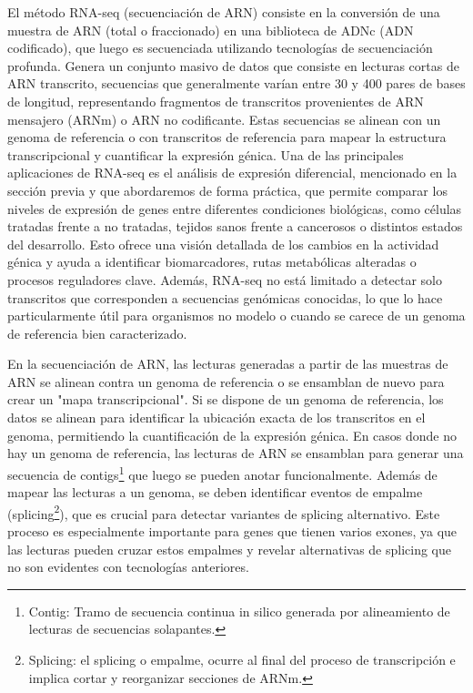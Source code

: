 El método RNA-seq (secuenciación de ARN) consiste en la conversión de una muestra de ARN (total o fraccionado) en una biblioteca de ADNc 
(ADN codificado), que luego es secuenciada utilizando tecnologías de secuenciación profunda. Genera un conjunto masivo de datos que consiste 
en lecturas cortas de ARN transcrito, secuencias que generalmente varían entre 30 y 400 pares de bases de longitud, representando fragmentos 
de transcritos provenientes de ARN mensajero (ARNm) o ARN no codificante. Estas secuencias se alinean con un genoma de referencia o con 
transcritos de referencia para mapear la estructura transcripcional y cuantificar la expresión génica. Una de las principales aplicaciones 
de RNA-seq es el análisis de expresión diferencial, mencionado en la sección previa y que abordaremos de forma práctica, que permite comparar 
los niveles de expresión de genes entre diferentes condiciones 
biológicas, como células tratadas frente a no tratadas, tejidos sanos frente a cancerosos o distintos estados del desarrollo. Esto ofrece 
una visión detallada de los cambios en la actividad génica y ayuda a identificar biomarcadores, rutas metabólicas alteradas o procesos 
reguladores clave. Además, RNA-seq no está limitado a detectar solo transcritos que corresponden a secuencias genómicas conocidas, 
lo que lo hace particularmente útil para organismos no modelo o cuando se carece de un genoma de referencia bien caracterizado\cite{transcriptomics-2-RNA-seq}.\newline

En la secuenciación de ARN, las lecturas generadas a partir de las muestras de ARN se alinean contra un genoma de referencia o se ensamblan de
nuevo para crear un "mapa transcripcional". Si se dispone de un genoma de referencia, los datos se alinean para identificar la ubicación exacta de
los transcritos en el genoma, permitiendo la cuantificación de la expresión génica. En casos donde no hay un genoma de referencia, las lecturas 
de ARN se ensamblan para generar una secuencia de contigs\footnote[3]{Contig: Tramo de secuencia continua in silico generada por alineamiento 
de lecturas de secuencias solapantes\cite{contig-definition}.} que luego se pueden anotar funcionalmente. Además de mapear las lecturas a un genoma, 
se deben identificar eventos de empalme (splicing\footnote[4]{Splicing: el splicing o empalme, ocurre al final del proceso de transcripción e 
implica cortar y reorganizar secciones de ARNm.\cite{splicing-definition}}), que es crucial para detectar variantes de splicing alternativo. Este proceso es especialmente 
importante para genes que tienen varios exones, ya que las lecturas pueden cruzar estos empalmes y revelar alternativas de splicing que no son 
evidentes con tecnologías anteriores\cite{transcriptomics-2-RNA-seq-2}. \newline %


